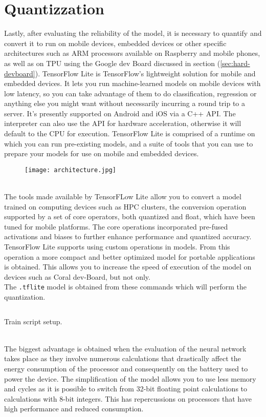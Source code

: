 \section{Quantizzation}
Lastly, after evaluating the reliability of the model, it is necessary to
quantify and convert it to run on mobile devices, embedded devices or other
specific architectures such as ARM processors available on Raspberry and mobile
phones, as well as on TPU using the Google dev Board discussed in section
(\ref{sec:hard-devboard}).
TensorFlow Lite is TensorFlow’s lightweight solution for mobile and embedded
devices. It lets you run machine-learned models on mobile devices with low
latency, so you can take advantage of them to do classification, regression or
anything else you might want without necessarily incurring a round trip to a
server. It’s presently supported on Android and iOS via a C++ API.
The interpreter can also use the API for hardware
acceleration, otherwise it will default to the CPU for execution.
TensorFlow Lite is comprised of a runtime on which you can run pre-existing
models, and a suite of tools that you can use to prepare your models for use on
mobile and embedded devices.
%
%
\begin{figure}[htb]
	\centering
	\texttt{[image: architecture.jpg]}
	\label{fig:tflite-architecture}
\end{figure}
%
%
\\The tools made available by TensorFLow Lite allow you to convert a model trained
on computing devices such as HPC clusters, the conversion operation supported by
a set of core operators, both quantized and float, which have been tuned for
mobile platforms. The core operations incorporated pre-fused activations and
biases to further enhance performance and quantized accuracy. 
TensorFlow Lite supports using custom operations in models. 
From this operation a more compact and better optimized model for portable
applications is obtained. This allows you to increase the speed of execution of
the model on devices such as Coral dev-Board, but not only.\\
The \texttt{.tflite} model is obtained from these commands which will perform
the quantization.
%
\begin{listing}[ht] 
\inputminted[frame=lines,framesep=2mm, linenos=true, autogobble, breaklines=true, fontsize=\scriptsize, firstline=16, lastline=46]{shell}{neuralnetworks/code/tflite_ssd_mobilenet_v2_coco_2018_03_29.sh} 
\caption{Train script setup.} 
\label{lst:tflite-code-shell} 
\end{listing}
%
\\The biggest advantage is obtained when the evaluation of the neural network
takes place as they involve numerous calculations that drastically affect the
energy consumption of the processor and consequently on the battery used to
power the device. 
The simplification of the model allows you to use less memory and cycles as it
is possible to switch from 32-bit floating point calculations to calculations
with 8-bit integers. 
This has repercussions on processors that have high performance and reduced
consumption.